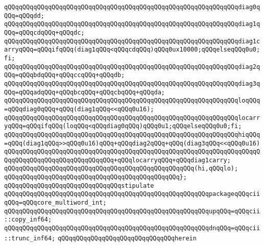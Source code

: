 \verb|qQQqqQQqqQQqqQQqqQQqqQQqqQQqqQQqqQQqqQQqqQQqqQQqqQQqqQQqqQQqqQQqdiag0qQQq=qQQqdd;|\newline
\verb|qQQqqQQqqQQqqQQqqQQqqQQqqQQqqQQqqQQqqQQqqQQqqQQqqQQqqQQqqQQqqQQqdiag1qQQq=qQQqcdqQQq+qQQqdc;|\newline
\verb|qQQqqQQqqQQqqQQqqQQqqQQqqQQqqQQqqQQqqQQqqQQqqQQqqQQqqQQqqQQqqQQqdiag1carryqQQq=qQQqifqQQq(diag1qQQq<qQQqcdqQQq)qQQq0ux10000;qQQqelseqQQq0u0;fi;|\newline
\verb|qQQqqQQqqQQqqQQqqQQqqQQqqQQqqQQqqQQqqQQqqQQqqQQqqQQqqQQqqQQqqQQqdiag2qQQq=qQQqbdqQQq+qQQqccqQQq+qQQqdb;|\newline
\verb|qQQqqQQqqQQqqQQqqQQqqQQqqQQqqQQqqQQqqQQqqQQqqQQqqQQqqQQqqQQqqQQqdiag3qQQq=qQQqadqQQq+qQQqbcqQQq+qQQqcbqQQq+qQQqda;|\newline
\verb|qQQqqQQqqQQqqQQqqQQqqQQqqQQqqQQqqQQqqQQqqQQqqQQqqQQqqQQqqQQqqQQqloqQQq=qQQqdiag0qQQq+qQQq(diag1qQQq<<qQQq0u16);|\newline
\verb|qQQqqQQqqQQqqQQqqQQqqQQqqQQqqQQqqQQqqQQqqQQqqQQqqQQqqQQqqQQqqQQqlocarryqQQq=qQQqifqQQq(loqQQq<qQQqdiag0qQQq)qQQq0u1;qQQqelseqQQq0u0;fi;|\newline
\verb|qQQqqQQqqQQqqQQqqQQqqQQqqQQqqQQqqQQqqQQqqQQqqQQqqQQqqQQqqQQqqQQqhiqQQq=qQQq(diag1qQQq>>qQQq0u16)qQQq+qQQqdiag2qQQq+qQQq(diag3qQQq<<qQQq0u16)|\newline
\verb|qQQqqQQqqQQqqQQqqQQqqQQqqQQqqQQqqQQqqQQqqQQqqQQqqQQqqQQqqQQqqQQqqQQqqQQqqQQqqQQqqQQqqQQqqQQqqQQqqQQq+qQQqlocarryqQQq+qQQqdiag1carry;|\newline
\verb|qQQqqQQqqQQqqQQqqQQqqQQqqQQqqQQqqQQqqQQqqQQqqQQqqQQq(hi,qQQqlo);|\newline
\verb|qQQqqQQqqQQqqQQqqQQqqQQqqQQqqQQqqQQqqQQqqQQqqQQq};|\newline
\newline
\verb|qQQqqQQqqQQqqQQqqQQqqQQqqQQqqQQqstipulate|\newline
\newline
\verb|qQQqqQQqqQQqqQQqqQQqqQQqqQQqqQQqqQQqqQQqqQQqqQQqqQQqqQQqpackageqQQqciiqQQq=qQQqcore_multiword_int;|\newline
\newline
\verb|qQQqqQQqqQQqqQQqqQQqqQQqqQQqqQQqqQQqqQQqqQQqqQQqqQQqqQQqupqQQq=qQQqcii::copy_inf64;|\newline
\verb|qQQqqQQqqQQqqQQqqQQqqQQqqQQqqQQqqQQqqQQqqQQqqQQqqQQqqQQqdnqQQq=qQQqcii::trunc_inf64;|\newline
\newline
\verb|qQQqqQQqqQQqqQQqqQQqqQQqqQQqqQQqherein|\newline
